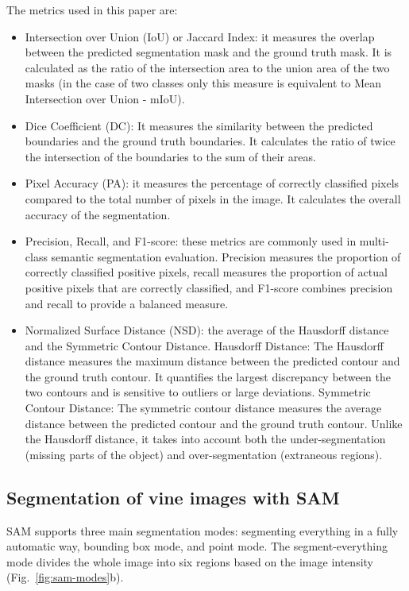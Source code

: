 \documentclass[runningheads]{llncs}
\begin{document}
The metrics used in this paper are:
\begin{itemize}
\item Intersection over Union (IoU) or Jaccard Index: it measures the overlap between the predicted segmentation mask and the ground truth mask. It is calculated as the ratio of the intersection area to the union area of the two masks (in the case of two classes only this measure is equivalent to Mean Intersection over Union - mIoU).
\item Dice Coefficient (DC): It measures the similarity between the predicted boundaries and the ground truth boundaries. It calculates the ratio of twice the intersection of the boundaries to the sum of their areas.
\item Pixel Accuracy (PA): it measures the percentage of correctly classified pixels compared to the total number of pixels in the image. It calculates the overall accuracy of the segmentation.
\item Precision, Recall, and F1-score: these metrics are commonly used in multi-class semantic segmentation evaluation. Precision measures the proportion of correctly classified positive pixels, recall measures the proportion of actual positive pixels that are correctly classified, and F1-score combines precision and recall to provide a balanced measure.
\item Normalized Surface Distance (NSD): the average of the Hausdorff distance and the Symmetric Contour Distance. Hausdorff Distance: The Hausdorff distance measures the maximum distance between the predicted contour and the ground truth contour. It quantifies the largest discrepancy between the two contours and is sensitive to outliers or large deviations. Symmetric Contour Distance: The symmetric contour distance measures the average distance between the predicted contour and the ground truth contour. Unlike the Hausdorff distance, it takes into account both the under-segmentation (missing parts of the object) and over-segmentation (extraneous regions).
\end{itemize}

\subsection{Segmentation of vine images with SAM}

SAM supports three main segmentation modes: segmenting everything in a fully automatic way, bounding box mode, and point mode. The segment-everything mode divides the whole image into six regions based on the image intensity (Fig.~\ref{fig:sam-modes}b).
\end{document}
